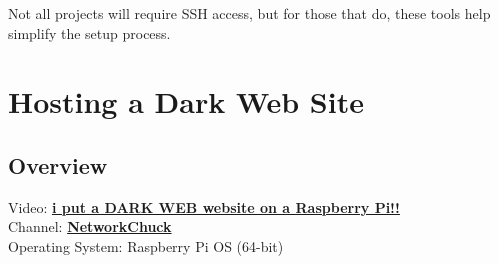 \documentclass[a4paper,12pt]{article}
\begin{document}
Not all projects will require SSH access, but for those that do, these tools help simplify the setup process.  

\section{Hosting a Dark Web Site}

\subsection{Overview}
Video: \href{https://www.youtube.com/watch?v=bllS9tkCkaM}{\textbf{\color{blue}i put a DARK WEB website on a Raspberry Pi!!}} \\
Channel: \href{https://www.youtube.com/@NetworkChuck}{\textbf{\color{blue}NetworkChuck}} \\
Operating System: Raspberry Pi OS (64-bit)
\end{document}
